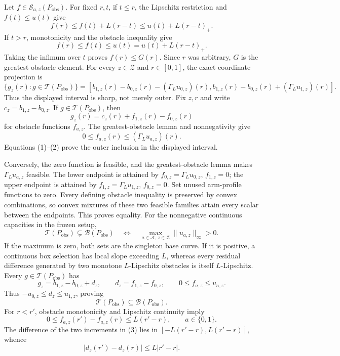 Let \(f\in\mathcal S_{a,z}(P_{\mathrm{obs}})\).  For fixed \(r,t\), if \(t\leq r\), the Lipschitz restriction and \(f(t)\leq u(t)\) give
\[
f(r)\leq f(t)+L(r-t)\leq u(t)+L(r-t)_+.
\]
If \(t>r\), monotonicity and the obstacle inequality give
\[
f(r)\leq f(t)\leq u(t)=u(t)+L(r-t)_+.
\]
Taking the infimum over \(t\) proves \(f(r)\leq G(r)\).  Since \(r\) was arbitrary, \(G\) is the greatest obstacle element.
For every \(z\in\mathcal Z\) and \(r\in[0,1]\), the exact coordinate projection is
\[
\{g_z(r):g\in\mathcal T(P_{\mathrm{obs}})\}
=\left[
b_{1,z}(r)-b_{0,z}(r)-(\Gamma_Lu_{0,z})(r),
b_{1,z}(r)-b_{0,z}(r)+(\Gamma_Lu_{1,z})(r)
\right].
\]
Thus the displayed interval is sharp, not merely outer.
Fix \(z,r\) and write \(c_z=b_{1,z}-b_{0,z}\).  If \(g\in\mathcal T(P_{\mathrm{obs}})\), then
\[
g_z(r)=c_z(r)+f_{1,z}(r)-f_{0,z}(r)
\tag{1}
\]
for obstacle functions \(f_{a,z}\).  The greatest-obstacle lemma and nonnegativity give
\[
0\leq f_{a,z}(r)\leq(\Gamma_Lu_{a,z})(r).
\tag{2}
\]
Equations (1)--(2) prove the outer inclusion in the displayed interval.

Conversely, the zero function is feasible, and the greatest-obstacle lemma makes \(\Gamma_Lu_{a,z}\) feasible.  The lower endpoint is attained by \(f_{0,z}=\Gamma_Lu_{0,z}\), \(f_{1,z}=0\); the upper endpoint is attained by \(f_{1,z}=\Gamma_Lu_{1,z}\), \(f_{0,z}=0\).  Set unused arm-profile functions to zero.  Every defining obstacle inequality is preserved by convex combinations, so convex mixtures of these two feasible families attain every scalar between the endpoints.  This proves equality.
For the nonnegative continuous capacities in the frozen setup,
\[
\mathcal T(P_{\mathrm{obs}})\subsetneq\mathcal B(P_{\mathrm{obs}})
\quad\Longleftrightarrow\quad
\max_{a\in\mathcal A,\,z\in\mathcal Z}\|u_{a,z}\|_\infty>0.
\]
If the maximum is zero, both sets are the singleton base curve.  If it is positive, a continuous box selection has local slope exceeding \(L\), whereas every residual difference generated by two monotone \(L\)-Lipschitz obstacles is itself \(L\)-Lipschitz.
Every \(g\in\mathcal T(P_{\mathrm{obs}})\) has
\[
g_z=b_{1,z}-b_{0,z}+d_z,\qquad
d_z=f_{1,z}-f_{0,z},\qquad
0\leq f_{a,z}\leq u_{a,z}.
\tag{1}
\]
Thus \(-u_{0,z}\leq d_z\leq u_{1,z}\), proving
\[
\mathcal T(P_{\mathrm{obs}})\subseteq\mathcal B(P_{\mathrm{obs}}).
\tag{2}
\]
For \(r<r'\), obstacle monotonicity and Lipschitz continuity imply
\[
0\leq f_{a,z}(r')-f_{a,z}(r)\leq L(r'-r),\qquad a\in\{0,1\}.
\tag{3}
\]
The difference of the two increments in (3) lies in \([-L(r'-r),L(r'-r)]\), whence
\[
|d_z(r')-d_z(r)|\leq L|r'-r|.
\tag{4}
\]

